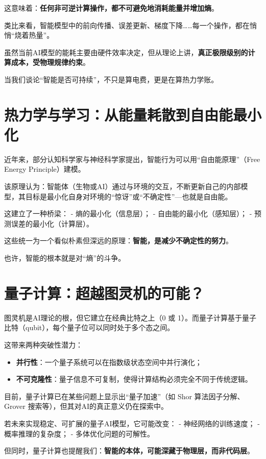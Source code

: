 这意味着：\textbf{任何非可逆计算操作，都不可避免地消耗能量并增加熵}。

类比来看，智能模型中的前向传播、误差更新、梯度下降……每一个操作，都在悄悄“烧着热量”。

虽然当前AI模型的能耗主要由硬件效率决定，但从理论上讲，\textbf{真正极限级别的计算成本，受物理规律约束}。

当我们谈论“智能是否可持续”，不只是算电费，更是在算热力学账。

\section*{热力学与学习：从能量耗散到自由能最小化}

近年来，部分认知科学家与神经科学家提出，智能行为可以用“自由能原理”（Free Energy Principle）建模。

该原理认为：智能体（生物或AI）通过与环境的交互，不断更新自己的内部模型，其目标是最小化自身对环境的“惊讶”或“不确定性”---也就是自由能。

这建立了一种桥梁：
- 熵的最小化（信息层）；
- 自由能的最小化（感知层）；
- 预测误差的最小化（计算层）。

这些统一为一个看似朴素但深远的原理：\textbf{智能，是减少不确定性的努力}。

也许，智能的根本就是对“熵”的斗争。

\section*{量子计算：超越图灵机的可能？}

图灵机是AI理论的根，但它建立在经典比特之上（0 或 1）。而量子计算基于量子比特（qubit），每个量子位可以同时处于多个态之间。

这带来两种突破性潜力：

\begin{itemize}
\item \textbf{并行性}：一个量子系统可以在指数级状态空间中并行演化；
\item \textbf{不可克隆性}：量子信息不可复制，使得计算结构必须完全不同于传统逻辑。
\end{itemize}

目前，量子计算已在某些问题上显示出“量子加速”（如 Shor 算法因子分解、Grover 搜索等），但其对AI的真正意义仍在探索中。

若未来实现稳定、可扩展的量子AI模型，它可能改变：
- 神经网络的训练速度；
- 概率推理的复杂度；
- 多体优化问题的可解性。

但同时，量子计算也提醒我们：\textbf{智能的本体，可能深藏于物理层，而非代码层}。

